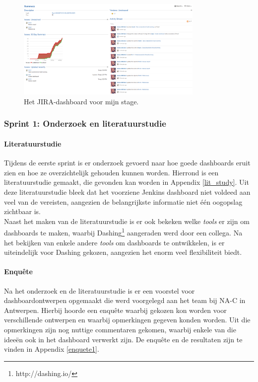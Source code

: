 \documentclass[10pt,a4paper]{article}
\begin{document}
\begin{figure}[ht!]
\centering
\includegraphics[width=90mm]{myJIRAscreenshot.png}
\caption{Het JIRA-dashboard voor mijn stage.} 
\label{my_jira}
\end{figure}

\subsubsection{Sprint 1: Onderzoek en literatuurstudie} 
\label{sprint1}
\paragraph{Literatuurstudie} Tijdens de eerste sprint is er onderzoek gevoerd naar hoe goede dashboards eruit zien en hoe ze overzichtelijk gehouden kunnen worden. Hierrond is een literatuurstudie gemaakt, die gevonden kan worden in Appendix \ref{lit_study}. Uit deze literatuurstudie bleek dat het voorziene Jenkins dashboard niet voldeed aan veel van de vereisten, aangezien de belangrijkste informatie niet \'e\'en oogopslag zichtbaar is.\\
Naast het maken van de literatuurstudie is er ook bekeken welke \textit{tools} er zijn om dashboards te maken, waarbij Dashing\footnote{http://dashing.io/} aangeraden werd door een collega. Na het bekijken van enkele andere \textit{tools} om dashboards te ontwikkelen, is er uiteindelijk voor Dashing gekozen, aangezien het enorm veel flexibiliteit biedt.
\paragraph{Enqu\^ete}
Na het onderzoek en de literatuurstudie is er een voorstel voor dashboardontwerpen opgemaakt die werd voorgelegd aan het team bij NA-C in Antwerpen. Hierbij hoorde een enqu\^ete waarbij gekozen kon worden voor verschillende ontwerpen en waarbij opmerkingen gegeven konden worden. Uit die opmerkingen zijn nog nuttige commentaren gekomen, waarbij enkele van die idee\"en ook in het dashboard verwerkt zijn. De enqu\^ete en de resultaten zijn te vinden in Appendix \ref{enquete1}. 
\end{document}
